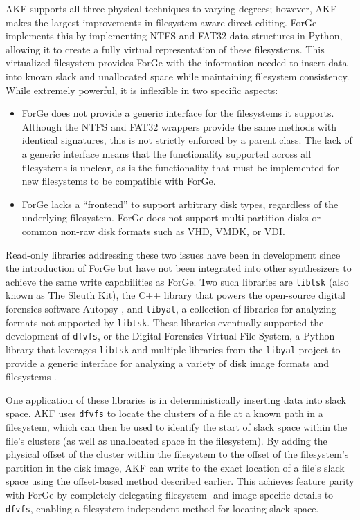 AKF supports all three physical techniques to varying degrees; however,
AKF makes the largest improvements in filesystem-aware direct editing.
ForGe \citep{vistiAutomaticCreationComputer2015} implements this by
implementing NTFS and FAT32 data structures in Python, allowing it to
create a fully virtual representation of these filesystems. This
virtualized filesystem provides ForGe with the information needed to
insert data into known slack and unallocated space while maintaining
filesystem consistency. While extremely powerful, it is inflexible in
two specific aspects:

\begin{itemize}
\item
  ForGe does not provide a generic interface for the filesystems it
  supports. Although the NTFS and FAT32 wrappers provide the same
  methods with identical signatures, this is not strictly enforced by a
  parent class. The lack of a generic interface means that the
  functionality supported across all filesystems is unclear, as is the
  functionality that must be implemented for new filesystems to be
  compatible with ForGe.
\item
  ForGe lacks a ``frontend'' to support arbitrary disk types, regardless
  of the underlying filesystem. ForGe does not support multi-partition
  disks or common non-raw disk formats such as VHD, VMDK, or VDI.
\end{itemize}

Read-only libraries addressing these two issues have been in development
since the introduction of ForGe but have not been integrated into other
synthesizers to achieve the same write capabilities as ForGe. Two such
libraries are \passthrough{\lstinline!libtsk!} (also known as The Sleuth
Kit), the C++ library that powers the open-source digital forensics
software Autopsy \citep{SleuthkitSleuthkit2025}, and
\passthrough{\lstinline!libyal!}, a collection of libraries for
analyzing formats not supported by \passthrough{\lstinline!libtsk!}.
These libraries eventually supported the development of
\passthrough{\lstinline!dfvfs!}, or the Digital Forensics Virtual File
System, a Python library that leverages \passthrough{\lstinline!libtsk!}
and multiple libraries from the \passthrough{\lstinline!libyal!} project
to provide a generic interface for analyzing a variety of disk image
formats and filesystems \citep{Log2timelineDfvfs2025}.

One application of these libraries is in deterministically inserting
data into slack space. AKF uses \passthrough{\lstinline!dfvfs!} to
locate the clusters of a file at a known path in a filesystem, which can
then be used to identify the start of slack space within the file's
clusters (as well as unallocated space in the filesystem). By adding the
physical offset of the cluster within the filesystem to the offset of
the filesystem's partition in the disk image, AKF can write to the exact
location of a file's slack space using the offset-based method described
earlier. This achieves feature parity with ForGe by completely
delegating filesystem- and image-specific details to
\passthrough{\lstinline!dfvfs!}, enabling a filesystem-independent
method for locating slack space.

